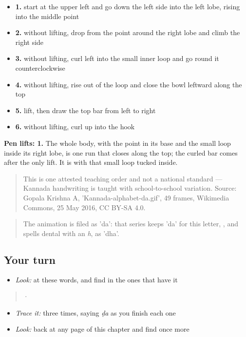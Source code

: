 \begin{itemize}
\raggedright
  \item \textbf{1.} start at the upper left and go down the left side into the left lobe, rising into the middle point
  \item \textbf{2.} without lifting, drop from the point around the right lobe and climb the right side
  \item \textbf{3.} without lifting, curl left into the small inner loop and go round it counterclockwise
  \item \textbf{4.} without lifting, rise out of the loop and close the bowl leftward along the top
  \item \textbf{5.} lift, then draw the top bar from left to right
  \item \textbf{6.} without lifting, curl up into the hook
\end{itemize}

\textbf{Pen lifts: 1.} The whole body, with the point in its base and the small loop inside its right lobe, is one run that closes along the top; the curled bar comes after the only lift. It is  with that small loop tucked inside.

\begin{quote}
This is one attested teaching order and not a national standard — Kannada handwriting is taught with school-to-school variation. Source: Gopala Krishna A, 'Kannada-alphabet-da.gif', 49 frames, Wikimedia Commons, 25 May 2016, CC BY-SA 4.0.
\end{quote}

\begin{quote}
The animation is filed as 'da': that series keeps 'da' for this letter, , and spells dental  with an \emph{h}, as 'dha'.
\end{quote}

\subsection*{Your turn}
\begin{itemize}
\raggedright
  \item \emph{Look:} at these words, and find  in the ones that have it
\end{itemize}

\begin{quote}
  ·  
\end{quote}

\begin{itemize}
\raggedright
  \item \emph{Trace it:}  three times, saying \emph{ḍa} as you finish each one
  \item \emph{Look:} back at any page of this chapter and find  once more
\end{itemize}

